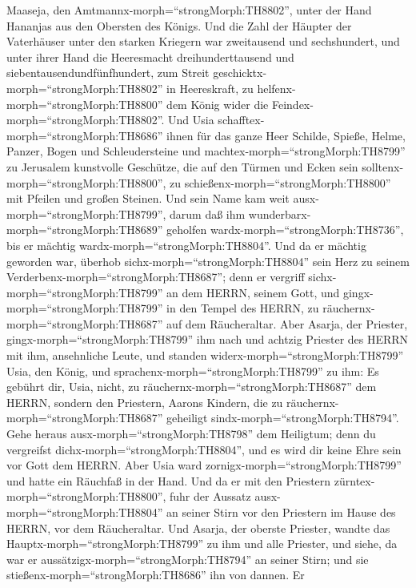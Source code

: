 Maaseja, den Amtmannx-morph=``strongMorph:TH8802'', unter der Hand
Hananjas aus den Obersten des Königs.  Und die Zahl der
Häupter der Vaterhäuser unter den starken Kriegern war zweitausend und
sechshundert,  und unter ihrer Hand die Heeresmacht
dreihunderttausend und siebentausendundfünfhundert, zum Streit
geschicktx-morph=``strongMorph:TH8802'' in Heereskraft, zu
helfenx-morph=``strongMorph:TH8800'' dem König wider die
Feindex-morph=``strongMorph:TH8802''.  Und Usia
schafftex-morph=``strongMorph:TH8686'' ihnen für das ganze Heer Schilde,
Spieße, Helme, Panzer, Bogen und Schleudersteine  und
machtex-morph=``strongMorph:TH8799'' zu Jerusalem kunstvolle Geschütze,
die auf den Türmen und Ecken sein solltenx-morph=``strongMorph:TH8800'',
zu schießenx-morph=``strongMorph:TH8800'' mit Pfeilen und großen
Steinen. Und sein Name kam weit ausx-morph=``strongMorph:TH8799'', darum
daß ihm wunderbarx-morph=``strongMorph:TH8689'' geholfen
wardx-morph=``strongMorph:TH8736'', bis er mächtig
wardx-morph=``strongMorph:TH8804''.  Und da er mächtig
geworden war, überhob sichx-morph=``strongMorph:TH8804'' sein Herz zu
seinem Verderbenx-morph=``strongMorph:TH8687''; denn er vergriff
sichx-morph=``strongMorph:TH8799'' an dem HERRN, seinem Gott, und
gingx-morph=``strongMorph:TH8799'' in den Tempel des HERRN, zu
räuchernx-morph=``strongMorph:TH8687'' auf dem Räucheraltar.
 Aber Asarja, der Priester,
gingx-morph=``strongMorph:TH8799'' ihm nach und achtzig Priester des
HERRN mit ihm, ansehnliche Leute,  und standen
widerx-morph=``strongMorph:TH8799'' Usia, den König, und
sprachenx-morph=``strongMorph:TH8799'' zu ihm: Es gebührt dir, Usia,
nicht, zu räuchernx-morph=``strongMorph:TH8687'' dem HERRN, sondern den
Priestern, Aarons Kindern, die zu räuchernx-morph=``strongMorph:TH8687''
geheiligt sindx-morph=``strongMorph:TH8794''. Gehe heraus
ausx-morph=``strongMorph:TH8798'' dem Heiligtum; denn du vergreifst
dichx-morph=``strongMorph:TH8804'', und es wird dir keine Ehre sein vor
Gott dem HERRN.  Aber Usia ward
zornigx-morph=``strongMorph:TH8799'' und hatte ein Räuchfaß in der Hand.
Und da er mit den Priestern zürntex-morph=``strongMorph:TH8800'', fuhr
der Aussatz ausx-morph=``strongMorph:TH8804'' an seiner Stirn vor den
Priestern im Hause des HERRN, vor dem Räucheraltar.  Und
Asarja, der oberste Priester, wandte das
Hauptx-morph=``strongMorph:TH8799'' zu ihm und alle Priester, und siehe,
da war er aussätzigx-morph=``strongMorph:TH8794'' an seiner Stirn; und
sie stießenx-morph=``strongMorph:TH8686'' ihn von dannen. Er
